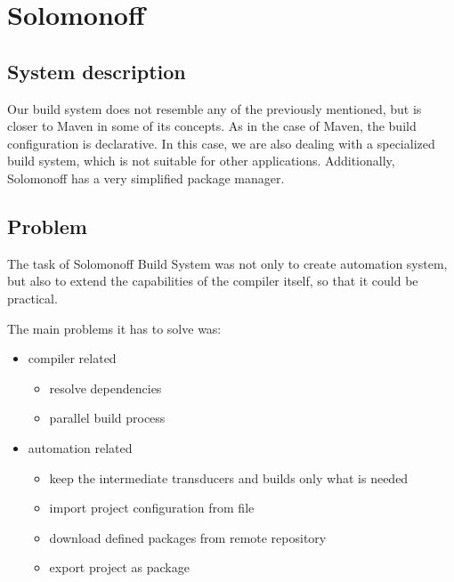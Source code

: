 \hypertarget{solomonoff}{%
\section{Solomonoff}\label{solomonoff}}

\hypertarget{system-description}{%
\subsection{System description}\label{system-description}}

Our build system does not resemble any of the previously mentioned, but
is closer to Maven in some of its concepts. As in the case of Maven, the
build configuration is declarative. In this case, we are also dealing
with a specialized build system, which is not suitable for other
applications. Additionally, Solomonoff has a very simplified package
manager.

\hypertarget{problem}{%
\subsection{Problem}\label{problem}}

The task of Solomonoff Build System was not only to create automation
system, but also to extend the capabilities of the compiler itself, so
that it could be practical.

The main problems it has to solve was:

\begin{itemize}
\item
  compiler related

  \begin{itemize}
  \item
    resolve dependencies
  \item
    parallel build process
  \end{itemize}
\item
  automation related

  \begin{itemize}
  \item
    keep the intermediate transducers and builds only what is needed
  \item
    import project configuration from file
  \item
    download defined packages from remote repository
  \item
    export project as package
  \end{itemize}
\end{itemize}

